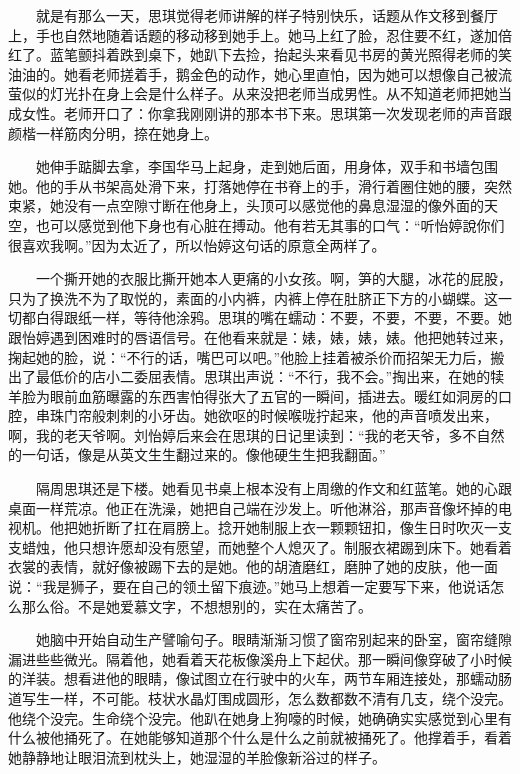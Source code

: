 \documentclass[12pt,UTF8]{ctexbook}
\begin{document}
　　就是有那么一天，思琪觉得老师讲解的样子特别快乐，话题从作文移到餐厅上，手也自然地随着话题的移动移到她手上。她马上红了脸，忍住要不红，遂加倍红了。蓝笔颤抖着跌到桌下，她趴下去捡，抬起头来看见书房的黄光照得老师的笑油油的。她看老师搓着手，鹅金色的动作，她心里直怕，因为她可以想像自己被流萤似的灯光扑在身上会是什么样子。从来没把老师当成男性。从不知道老师把她当成女性。老师开口了：你拿我刚刚讲的那本书下来。思琪第一次发现老师的声音跟颜楷一样筋肉分明，捺在她身上。

　　她伸手踮脚去拿，李国华马上起身，走到她后面，用身体，双手和书墙包围她。他的手从书架高处滑下来，打落她停在书脊上的手，滑行着圈住她的腰，突然束紧，她没有一点空隙寸断在他身上，头顶可以感觉他的鼻息湿湿的像外面的天空，也可以感觉到他下身也有心脏在搏动。他有若无其事的口气：\enquote{听怡婷說你们很喜欢我啊。}因为太近了，所以怡婷这句话的原意全两样了。

　　一个撕开她的衣服比撕开她本人更痛的小女孩。啊，笋的大腿，冰花的屁股，只为了换洗不为了取悦的，素面的小内裤，内裤上停在肚脐正下方的小蝴蝶。这一切都白得跟纸一样，等待他涂鸦。思琪的嘴在蠕动：不要，不要，不要，不要。她跟怡婷遇到困难时的唇语信号。在他看来就是：婊，婊，婊，婊。他把她转过来，掬起她的脸，说：\enquote{不行的话，嘴巴可以吧。}他脸上挂着被杀价而招架无力后，搬出了最低价的店小二委屈表情。思琪出声说：\enquote{不行，我不会。}掏出来，在她的犊羊脸为眼前血筋曝露的东西害怕得张大了五官的一瞬间，插进去。暖红如洞房的口腔，串珠门帘般刺刺的小牙齿。她欲呕的时候喉咙拧起来，他的声音喷发出来，啊，我的老天爷啊。刘怡婷后来会在思琪的日记里读到：\enquote{我的老天爷，多不自然的一句话，像是从英文生生翻过来的。像他硬生生把我翻面。}

　　隔周思琪还是下楼。她看见书桌上根本没有上周缴的作文和红蓝笔。她的心跟桌面一样荒凉。他正在洗澡，她把自己端在沙发上。听他淋浴，那声音像坏掉的电视机。他把她折断了扛在肩膀上。捻开她制服上衣一颗颗钮扣，像生日时吹灭一支支蜡烛，他只想许愿却没有愿望，而她整个人熄灭了。制服衣裙踢到床下。她看着衣裳的表情，就好像被踢下去的是她。他的胡渣磨红，磨肿了她的皮肤，他一面说：\enquote{我是狮子，要在自己的领土留下痕迹。}她马上想着一定要写下来，他说话怎么那么俗。不是她爱慕文字，不想想别的，实在太痛苦了。

　　她脑中开始自动生产譬喻句子。眼睛渐渐习惯了窗帘别起来的卧室，窗帘缝隙漏进些些微光。隔着他，她看着天花板像溪舟上下起伏。那一瞬间像穿破了小时候的洋装。想看进他的眼睛，像试图立在行驶中的火车，两节车厢连接处，那蠕动肠道写生一样，不可能。枝状水晶灯围成圆形，怎么数都数不清有几支，绕个没完。他绕个没完。生命绕个没完。他趴在她身上狗嚎的时候，她确确实实感觉到心里有什么被他捅死了。在她能够知道那个什么是什么之前就被捅死了。他撑着手，看着她静静地让眼泪流到枕头上，她湿湿的羊脸像新浴过的样子。
\end{document}
